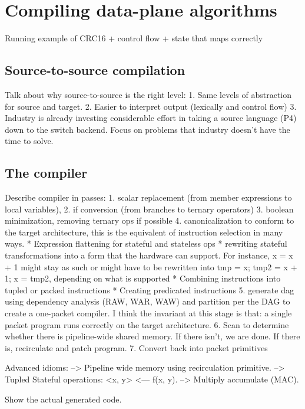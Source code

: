 \section{Compiling data-plane algorithms}
\label{s:compiler}
Running example of CRC16 + control flow + state
that maps correctly

\subsection{Source-to-source compilation}
Talk about why source-to-source is the right level:
1. Same levels of abstraction for source and target.
2. Easier to interpret output (lexically and control flow)
3. Industry is already investing considerable effort in taking a source language (P4) down to the switch backend.
Focus on problems that industry doesn't have the time to solve.

\subsection{The compiler}
Describe compiler in passes:
1. scalar replacement (from member expressions to local variables),
2. if conversion (from branches to ternary operators)
3. boolean minimization, removing ternary ops if possible
4. canonicalization to conform to the target architecture, this is the equivalent of instruction selection in many ways.
 * Expression flattening for stateful and stateless ops
 * rewriting stateful transformations into a form that the hardware can support. For instance, x = x + 1 might stay as such or might have to be rewritten into tmp = x; tmp2 = x + 1; x = tmp2, depending on what is supported
 * Combining instructions into tupled or packed instructions
 * Creating predicated instructions
5. generate dag using dependency analysis (RAW, WAR, WAW) and partition per the DAG to create a one-packet compiler. I think the invariant at this stage is that: a single packet program runs correctly on the target architecture.
6. Scan to determine whether there is pipeline-wide shared memory. If there isn't, we are done. If there is, recirculate and patch program.
7. Convert back into packet primitives

Advanced idioms:
--> Pipeline wide memory using recirculation primitive.
--> Tupled Stateful operations: <x, y> <--- f(x, y).
--> Multiply accumulate (MAC).

Show the actual generated code.
